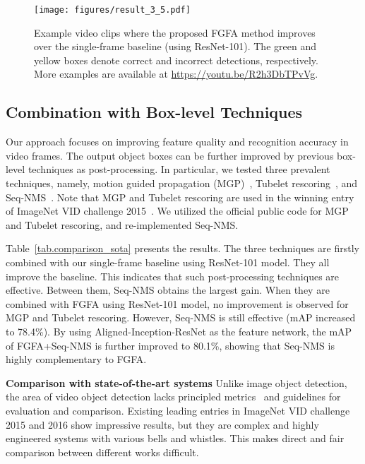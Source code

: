 \documentclass[10pt,twocolumn,letterpaper]{article}
\begin{document}
\begin{figure*}[t]
\begin{center}
\texttt{[image: figures/result\_3\_5.pdf]}
\end{center}
\caption{Example video clips where the proposed FGFA method improves over the single-frame baseline (using ResNet-101). The green and yellow boxes denote correct and incorrect detections, respectively. More examples are available at \url{https://youtu.be/R2h3DbTPvVg}.}
\label{fig.detection_results}
\end{figure*}

\subsection{Combination with Box-level Techniques}

Our approach focuses on improving feature quality and recognition accuracy in video frames. The output object boxes can be further improved by previous box-level techniques as post-processing. In particular, we tested three prevalent techniques, namely, motion guided propagation (MGP)~\cite{kang2016tcnn}, Tubelet rescoring~\cite{kang2016tcnn}, and Seq-NMS~\cite{han2016seqnms}. Note that MGP and Tubelet rescoring are used in the winning entry of ImageNet VID challenge 2015~\cite{kang2016tcnn}. We utilized the official public code for MGP and Tubelet rescoring, and re-implemented Seq-NMS.

Table~\ref{tab.comparison_sota} presents the results. The three techniques are firstly combined with our single-frame baseline using ResNet-101 model. They all improve the baseline. This indicates that such post-processing techniques are effective. Between them, Seq-NMS obtains the largest gain. When they are combined with FGFA using ResNet-101 model, no improvement is observed for MGP and Tubelet rescoring. However, Seq-NMS is still effective (mAP increased to 78.4\%). By using  Aligned-Inception-ResNet as the feature network, the mAP of FGFA+Seq-NMS is further improved to 80.1\%, showing that Seq-NMS is highly complementary to FGFA.

\textbf{Comparison with state-of-the-art systems} Unlike image object detection, the area of video object detection lacks principled metrics~\cite{zhang2016stability} and guidelines for evaluation and comparison. Existing leading entries in ImageNet VID challenge 2015 and 2016 show impressive results, but they are complex and highly engineered systems with various bells and whistles. This makes direct and fair comparison between different works difficult.
\end{document}

